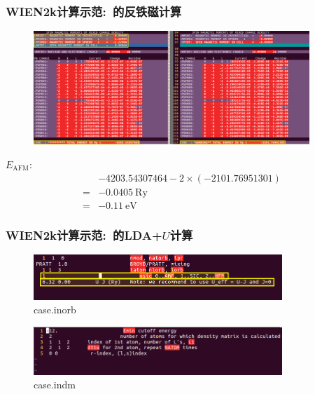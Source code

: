 {\frame
{
	\frametitle{\textrm{WIEN2k}计算示范:~的反铁磁计算}
\vspace*{-8pt}
\begin{figure}[h!]
\centering
\includegraphics[width=4.1in]{Figures/WIEN2k_AFM_Cr-6.png}
\label{Fig:WIEN2k_AFM-Cr-6}
\end{figure}
$E_{\mathrm{AFM}}$:
\begin{displaymath}
	\begin{aligned}
		&-4203.54307464-2\times(-2101.76951301)\\
		=&-0.0405~\mathrm{Ry}\\
		=&-0.11~\mathrm{eV}
	\end{aligned}
\end{displaymath}
}

\frame
{
	\frametitle{\textrm{WIEN2k}计算示范:~的\textrm{LDA+$U$}计算}
\vspace*{-2pt}
\begin{figure}[h!]
\centering
\includegraphics[width=3.7in]{Figures/WIEN2k_EuB6-inorb.png}
\caption{\tiny \textrm{case.inorb}}%
\label{Fig:WIEN2k_EuB6-inbor}
\end{figure}
\begin{figure}[h!]
\centering
\includegraphics[width=3.70in]{Figures/WIEN2k-indm.png}
\caption{\tiny \textrm{case.indm}}%
\label{Fig:WIEN2k_indm}
\end{figure}
}

}
